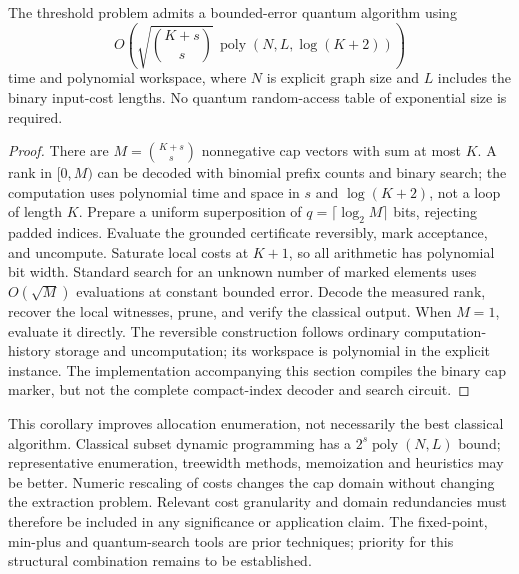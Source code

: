 \begin{corollary}
The threshold problem admits a bounded-error quantum algorithm using
\[
 O\!\left(\sqrt{\binom{K+s}{s}}\,
       \operatorname{poly}(N,L,\log(K+2))\right)
\]
time and polynomial workspace, where $N$ is explicit graph size and $L$
includes the binary input-cost lengths. No quantum random-access table of
exponential size is required.
\end{corollary}
\begin{proof}
There are $M=\binom{K+s}{s}$ nonnegative cap vectors with sum at most $K$.
A rank in $[0,M)$ can be decoded with binomial prefix counts and binary
search; the computation uses polynomial time and space in $s$ and
$\log(K+2)$, not a loop of length $K$. Prepare a uniform superposition of
$q=\lceil\log_2M\rceil$ bits, rejecting padded indices. Evaluate the grounded
certificate reversibly, mark acceptance, and uncompute. Saturate local costs
at $K+1$, so all arithmetic has polynomial bit width. Standard search for
an unknown number of marked elements uses $O(\sqrt M)$ evaluations at
constant bounded error. Decode the measured rank, recover the local
witnesses, prune, and verify the classical output. When $M=1$, evaluate it
directly. The reversible construction follows ordinary computation-history
storage and uncomputation; its workspace is polynomial in the explicit
instance. The implementation accompanying this section compiles the binary
cap marker, but not the complete compact-index decoder and search circuit.
\end{proof}

This corollary improves allocation enumeration, not necessarily the best
classical algorithm. Classical subset dynamic programming has a
$2^s\operatorname{poly}(N,L)$ bound; representative enumeration, treewidth
methods, memoization and heuristics may be better. Numeric rescaling of
costs changes the cap domain without changing the extraction problem.
Relevant cost granularity and domain redundancies must therefore be included
in any significance or application claim. The fixed-point, min-plus and
quantum-search tools are prior techniques; priority for this structural
combination remains to be established.
